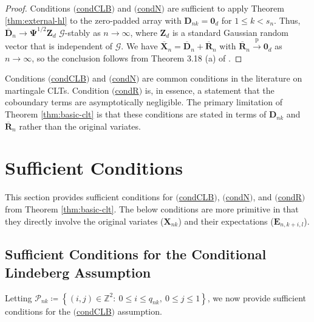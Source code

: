 \documentclass[11pt]{article}
\renewcommand\vec[1]{\boldsymbol{#1}}
\newcommand\mat[1]{\mathbf{#1}}
\newcommand{\G}{\mathcal{G}}
\newcommand{\Z}{\mathbb{Z}}
\newcommand{\PP}{\mathcal{P}}
\newcommand{\refitem}[1]{$\mathrm{(}$\hyperlink{cond:#1}{\csname cond#1\endcsname}$\mathrm{)}$}
\newcommand{\pconverge}{\overset{\mathrm{p}}{\to}}
\theoremstyle{definition}
\begin{document}
\begin{proof}
Conditions \refitem{CLB} and \refitem{N} are sufficient to apply Theorem \ref{thm:external-hl} to the zero-padded array with \(\vec D_{nk}=\vec0_d\) for \(1\leq k<s_n\).
Thus, $\overline{\vec{D}}_n \to \mat{\Psi}^{1/2} \vec{Z}_d$ $\G$-stably as $n \to \infty$, where $\vec{Z}_d$ is a standard Gaussian random vector that is independent of $\G$.
We have $\overline{\vec{X}}_n = \overline{\vec{D}}_n + \overline{\vec{R}}_n$ with $\overline{\vec{R}}_n \pconverge \vec{0}_d$ as $n \to \infty$, so the conclusion follows from Theorem 3.18 (a) of \citet{hausler_stable_2015}.
\end{proof}

Conditions \refitem{CLB} and \refitem{N} are common conditions in the literature on martingale CLTs.
Condition \refitem{R} is, in essence, a statement that the coboundary terms are asymptotically negligible.
The primary limitation of Theorem \ref{thm:basic-clt} is that these conditions are stated in terms of $\vec{D}_{nk}$ and $\overline{\vec{R}}_n$ rather than the original variates.

\section{Sufficient Conditions}\label{sec:sufficient-conditions}

This section provides sufficient conditions for \refitem{CLB}, \refitem{N}, and \refitem{R} from Theorem \ref{thm:basic-clt}.
The below conditions are more primitive in that they directly involve the original variates ($\vec{X}_{nk}$) and their expectations ($\vec{E}_{n,k+i,l}$).

\subsection{Sufficient Conditions for the Conditional Lindeberg Assumption}\label{sec:clb-sufficient}

Letting $\PP_{nk} \coloneqq \left\{(i, j) \in \Z^2:\ 0 \leq i \leq q_{nk},\ 0 \leq j \leq 1\right\}$, we now provide sufficient conditions for the \refitem{CLB} assumption.
\end{document}
